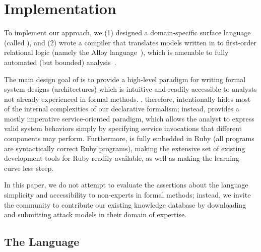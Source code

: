
\section{Implementation}
\label{sec-implementation}

To implement our approach, we (1) designed a domain-specific surface
language (called \sLangLong), and (2) wrote a compiler that translates
models written in \sLang to first-order relational logic (namely the
Alloy language~\cite{alloy}), which is amenable to fully automated
(but bounded) analysis~\cite{kodkod}.

The main design goal of \sLang is to provide a high-level paradigm for
writing formal system designs (architectures) which is intuitive and
readily accessible to analysts not already experienced in formal
methods.  \sLang, therefore, intentionally hides most of the internal
complexities of our declarative formalism; instead, \sLang provides a
mostly imperative service-oriented paradigm, which allows the analyst
to express valid system behaviors simply by specifying service
invocations that different components may perform.  Furthermore,
\sLang is fully embedded in Ruby (all \sLang programs are
syntactically correct Ruby programs), making the extensive set of
existing development tools for Ruby readily available, as well as
making the learning curve less steep.

In this paper, we do not attempt to evaluate the assertions about the
language simplicity and accessibility to non-experts in formal
methods; instead, we invite the community to contribute our existing
knowledge database by downloading \sLang~\cite{slang-web} and
submitting attack models in their domain of expertise.\check{!}

\subsection{The \sLang Language}


